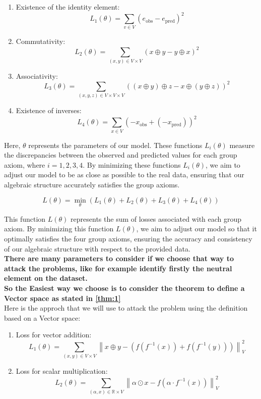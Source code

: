 \documentclass{report}
\begin{document}
    \begin{enumerate}
        \item Existence of the identity element:  \[
            L_1(\theta) = \sum_{v \in V} (e_{\text{obs}} - e_{\text{pred}})^2
            \]
        \item Commutativity:
        \[
        L_2(\theta) = \sum_{(x, y) \in V \times V} (x \oplus y - y \oplus x)^2
        \]
        \item Associativity:
        \[
        L_3(\theta) = \sum_{(x, y, z) \in V \times V \times V} ((x \oplus y) \oplus z - x \oplus (y \oplus z))^2
        \]
        \item Existence of inverses:
        \[
        L_4(\theta) = \sum_{x \in V} (-x_{\text{obs}} + (-x_{\text{pred}}))^2
        \] 
    \end{enumerate}
    
    Here, $\theta$ represents the parameters of our model.
    These functions $L_i(\theta)$ measure the discrepancies
    between the observed and predicted values for each group 
    axiom, where $i = 1, 2, 3, 4$. By minimizing these functions
    $L_i(\theta)$, we aim to adjust our model to be as close as
    possible to the real data, ensuring that our algebraic 
    structure accurately satisfies the group axioms. 

    $$
    L(\theta) = \min_{\theta} (L_1(\theta) + L_2(\theta) + L_3(\theta) + L_4(\theta))
    $$


    This function $L(\theta)$ represents the sum of losses 
    associated with each group axiom. By minimizing 
    this function $L(\theta)$, we aim to adjust our model so
    that it optimally satisfies the four group axioms, 
    ensuring the accuracy and consistency of our 
    algebraic structure with respect to the provided data.\\

    \textbf{There are many parameters to consider  if we choose that way to attack the problems, like for example identify firstly the neutral element on the dataset. \\
    So the Easiest way we choose is to consider the theorem to define a Vector space as stated in \ref{thm:1}}\\

    
    Here is the approch that we will use to attack the problem using the definition based on a Vector space:


    \begin{enumerate}
        \item Loss for vector addition:
        \[
            L_1(\theta) = \sum_{(x, y) \in V \times V} \left\lVert x \oplus y - \left(f(f^{-1}(x)) + f(f^{-1}(y))\right) \right\rVert_{V}^2
        \]
        \item Loss for scalar multiplication:
        \[
            L_2(\theta) = \sum_{(\alpha, x) \in \mathbb{R} \times V} \left\lVert \alpha \odot x - f(\alpha \cdot f^{-1}(x)) \right\rVert_{V}^2
        \]
    \end{enumerate}
\end{document}
